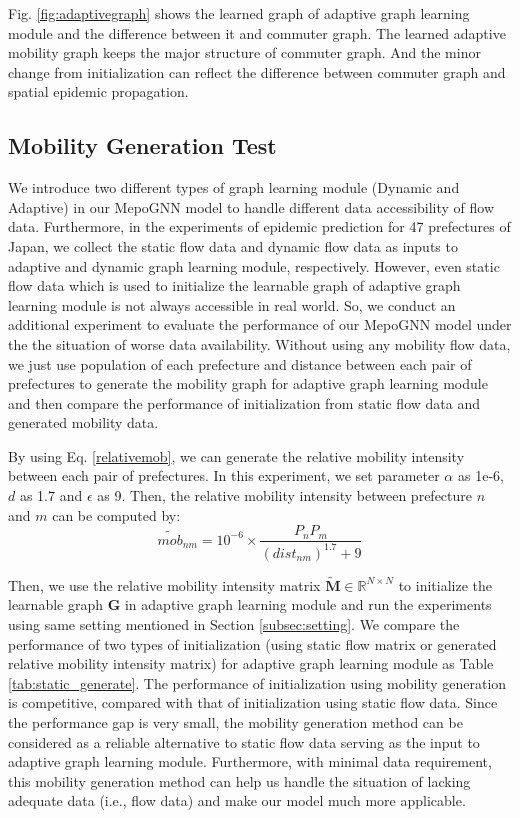 \documentclass[lettersize,journal]{IEEEtran}
\begin{document}
Fig. \ref{fig:adaptivegraph} shows the learned graph of adaptive graph learning module and the difference between it and commuter graph. The learned adaptive mobility graph keeps the major structure of commuter graph. And the minor change from initialization can reflect the difference between commuter graph and spatial epidemic propagation.

\subsection{Mobility Generation Test}
We introduce two different types of graph learning module (Dynamic and Adaptive) in our MepoGNN model to handle different data accessibility of flow data. Furthermore, in the experiments of epidemic prediction for 47 prefectures of Japan, we collect the static flow data and dynamic flow data as inputs to adaptive and dynamic graph learning module, respectively. However, even static flow data which is used to initialize the learnable graph of adaptive graph learning module is not always accessible in real world. So, we conduct an additional experiment to evaluate the performance of our MepoGNN model under the the situation of worse data availability. Without using any mobility flow data, we just use population of each prefecture and distance between each pair of prefectures to generate the mobility graph for adaptive graph learning module and then compare the performance of initialization from static flow data and generated mobility data. 

By using Eq. \ref{relativemob}, we can generate the relative mobility intensity between each pair of prefectures. In this experiment, we set parameter $\alpha$ as 1e-6, $d$ as 1.7 and $\epsilon$ as 9. Then, the relative mobility intensity between prefecture $n$ and $m$ can be computed by: 
\begin{equation}
    \widetilde{mob}_{nm} = 10^{-6} \times \frac{P_n P_m}{(dist_{nm})^{1.7} + 9}
\end{equation}

Then, we use the relative mobility intensity matrix $\mathbf{\widetilde M} \in \mathbb{R}^{N \times N}$ to initialize the learnable graph $\mathbf{G}$ in adaptive graph learning module and run the experiments using same setting mentioned in Section \ref{subsec:setting}. We compare the performance of two types of initialization (using static flow matrix or generated relative mobility intensity matrix) for adaptive graph learning module as Table \ref{tab:static_generate}. The performance of initialization using mobility generation is competitive, compared with that of initialization using static flow data. Since the performance gap is very small, the mobility generation method can be considered as a reliable alternative to static flow data serving as the input to adaptive graph learning module. Furthermore, with minimal data requirement, this mobility generation method can help us handle the situation of lacking adequate data (i.e., flow data) and make our model much more applicable. 
\end{document}
